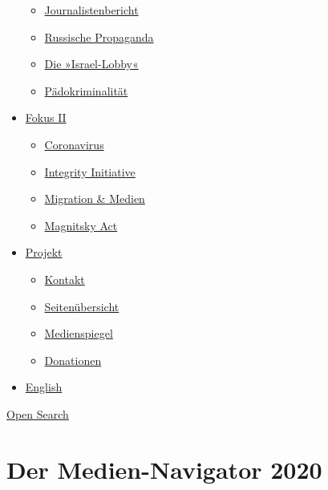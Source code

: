 \begin{itemize}
  \begin{itemize}
  \tightlist
  \item
    \href{https://swprs.org/bericht-eines-journalisten/}{Journalistenbericht}
  \item
    \href{https://swprs.org/russische-propaganda/}{Russische Propaganda}
  \item
    \href{https://swprs.org/die-israel-lobby-fakten-und-mythen/}{Die
    »Israel-Lobby«}
  \item
    \href{https://swprs.org/geopolitik-und-paedokriminalitaet/}{Pädokriminalität}
  \end{itemize}
\item
  \href{https://swprs.org/migration-und-medien/}{Fokus II}

  \begin{itemize}
  \tightlist
  \item
    \href{https://swprs.org/covid-19-hinweis-ii/}{Coronavirus}
  \item
    \href{https://swprs.org/die-integrity-initiative/}{Integrity
    Initiative}
  \item
    \href{https://swprs.org/migration-und-medien/}{Migration \& Medien}
  \item
    \href{https://swprs.org/der-fall-magnitsky/}{Magnitsky Act}
  \end{itemize}
\item
  \href{https://swprs.org/kontakt/}{Projekt}

  \begin{itemize}
  \tightlist
  \item
    \href{https://swprs.org/kontakt/}{Kontakt}
  \item
    \href{https://swprs.org/uebersicht/}{Seitenübersicht}
  \item
    \href{https://swprs.org/medienspiegel/}{Medienspiegel}
  \item
    \href{https://swprs.org/donationen/}{Donationen}
  \end{itemize}
\item
  \href{https://swprs.org/contact/}{English}
\end{itemize}

\protect\hyperlink{}{Open Search}

\hypertarget{der-medien-navigator-2020}{%
\section{Der Medien-Navigator 2020}\label{der-medien-navigator-2020}}

